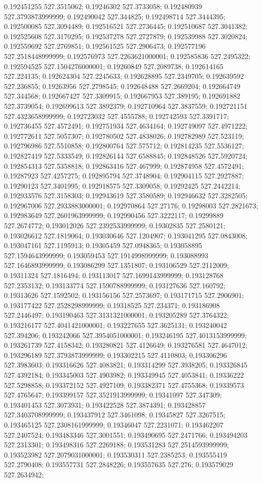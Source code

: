 0.192451255 527.3515062; 0.19246302 527.3733058; 0.192480939 527.3793873999999; 0.192490042 527.344825; 0.192498714 527.3444395; 0.192500085 527.3094489; 0.192516521 527.2736445; 0.192510687 527.3041382; 0.192525608 527.3170295; 0.192537278 527.2727879; 0.192539988 527.3020824; 0.192559692 527.2769851; 0.192561525 527.2906473; 0.192577196 527.2518448999999; 0.192576973 527.2263621000001; 0.192585836 527.2495322; 0.192594525 527.1504276000001; 0.19260849 527.2089738; 0.192614165 527.224135; 0.192624304 527.2245633; 0.192628895 527.2349705; 0.192639592 527.236855; 0.19263956 527.2798545; 0.192648488 527.2669204; 0.192664749 527.344568; 0.192667427 527.3309915; 0.192667953 527.389195; 0.192691882 527.3739054; 0.192699613 527.3892379; 0.192710964 527.3837559; 0.192721151 527.4323658999999; 0.192723032 527.4555788; 0.192742593 527.3391717; 0.192736455 527.4572491; 0.192751934 527.4634164; 0.192749097 527.4971222; 0.192772611 527.5057307; 0.192780502 527.4838026; 0.192782989 527.523119; 0.192796986 527.5510858; 0.192800764 527.575712; 0.192814235 527.5536127; 0.192827419 527.5333549; 0.192826144 527.6588845; 0.192848526 527.5920724; 0.192854313 527.5358818; 0.192863416 527.467999; 0.192874958 527.4572491; 0.19287923 527.4257275; 0.192895794 527.3748904; 0.192904115 527.2927887; 0.19290123 527.3401995; 0.192918575 527.3309058; 0.19292425 527.2442214; 0.192933576 527.3158303; 0.192943619 527.3580589; 0.192946632 527.3282505; 0.192967006 527.2933883000001; 0.192970864 527.27176; 0.19298003 527.2821673; 0.192983649 527.2601963999999; 0.192990456 527.3222117; 0.19299889 527.2674772; 0.193012026 527.2392533999999; 0.19302835 527.2580121; 0.193026612 527.1819064; 0.193030646 527.1204907; 0.193041295 527.0843008; 0.193047161 527.1195913; 0.19305459 527.0948365; 0.193058895 527.1594643999999; 0.193059453 527.1914998999999; 0.193088993 527.1646893999999; 0.193086299 527.1351807; 0.193106529 527.2112009; 0.19311324 527.1816494; 0.193113017 527.1699143999999; 0.193128768 527.2353132; 0.193133774 527.1590788999999; 0.193127636 527.160792; 0.19313626 527.1592502; 0.193156156 527.2573697; 0.193171715 527.2906901; 0.193177422 527.2528298999999; 0.19318525 527.234371; 0.193186908 527.2446497; 0.193190463 527.3131321000001; 0.193205289 527.3764322; 0.193216177 527.4041421000001; 0.193227655 527.3625131; 0.193240042 527.394206; 0.193242066 527.3954051000001; 0.193246195 527.4013153999999; 0.193261739 527.4158342; 0.193280821 527.4126649; 0.193276581 527.4647012; 0.193296189 527.3793873999999; 0.193302215 527.4110803; 0.193306296 527.3983603; 0.193316626 527.4083821; 0.193314299 527.3938205; 0.193326845 527.4392184; 0.193345003 527.4903982; 0.193349945 527.4053841; 0.19336222 527.5298858; 0.193372152 527.4927109; 0.193382371 527.4755368; 0.19339573 527.4765647; 0.193399157 527.3521913999999; 0.19341097 527.347309; 0.193401453 527.3073931; 0.193422528 527.3874391; 0.193428857 527.3403708999999; 0.193437912 527.3461098; 0.19345827 527.3267515; 0.193465125 527.2308161999999; 0.19346047 527.2231071; 0.193462207 527.2407524; 0.193483346 527.3001551; 0.193490695 527.2471766; 0.193494203 527.2313301; 0.193498316 527.2269188; 0.193531283 527.2514593999999; 0.193523982 527.2079031000001; 0.193530311 527.2385253; 0.193555419 527.2790408; 0.193557731 527.2848226; 0.193557635 527.276; 0.193579029 527.2634942; 